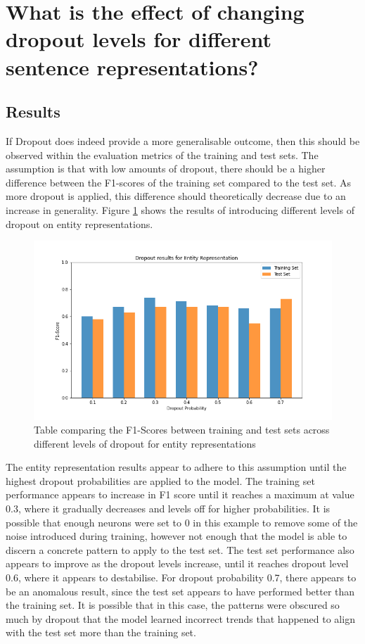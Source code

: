 \documentclass{l4proj}
\begin{document}
\section{What is the effect of changing dropout levels for different sentence representations?}

\subsection{Results}
If Dropout does indeed provide a more generalisable outcome, then this should be observed within the evaluation metrics of the training and test sets. The assumption is that with low amounts of dropout, there should be a higher difference between the F1-scores of the training set compared to the test set. As more dropout is applied, this difference should theoretically decrease due to an increase in generality. Figure \ref{fig:F1} shows the results of introducing different levels of dropout on entity representations.

\begin{figure}[htb]
    \centering
    \includegraphics[width=14cm]{images/EntityDrop.png}
  \caption{Table comparing the F1-Scores between training and test sets across different levels of dropout for entity representations}
  \label{fig:F1}
\end{figure}

\newpage

The entity representation results appear to adhere to this assumption until the highest dropout probabilities are applied to the model. The training set performance appears to increase in F1 score until it reaches a maximum at value 0.3, where it gradually decreases and levels off for higher probabilities. It is possible that enough neurons were set to 0 in this example to remove some of the noise introduced during training, however not enough that the model is able to discern a concrete pattern to apply to the test set. The test set performance also appears to improve as the dropout levels increase, until it reaches dropout level 0.6, where it appears to destabilise. For dropout probability 0.7, there appears to be an anomalous result, since the test set appears to have performed better than the training set. It is possible that in this case, the patterns were obscured so much by dropout that the model learned incorrect trends that happened to align with the test set more than the training set.
\end{document}
